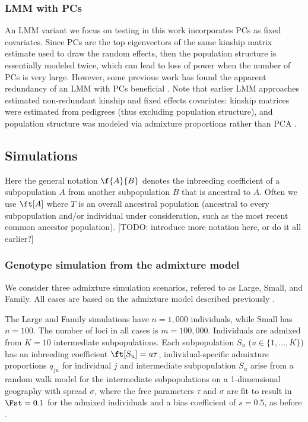 \documentclass[11pt]{article}
\begin{document}
\subsubsection{LMM with PCs}

An LMM variant we focus on testing in this work incorporates PCs as fixed covariates.
Since PCs are the top eigenvectors of the same kinship matrix estimate used to draw the random effects, then the population structure is essentially modeled twice, which can lead to loss of power when the number of PCs is very large.
However, some previous work has found the apparent redundancy of an LMM with PCs beneficial \citep{price_new_2010}.
Note that earlier LMM approaches estimated non-redundant kinship and fixed effects covariates: kinship matrices were estimated from pedigrees (thus excluding population structure), and population structure was modeled via admixture proportions rather than PCA \citep{yu_unified_2006, zhao_arabidopsis_2007}.


\subsection{Simulations}

Here the general notation $\f{A}{B}$ denotes the inbreeding coefficient of a subpopulation $A$ from another subpopulation $B$ that is ancestral to $A$.
Often we use $\ft[A]$ where $T$ is an overall ancestral population (ancestral to every subpopulation and/or individual under consideration, such as the most recent common ancestor population).
[TODO: introduce more notation here, or do it all earlier?]

\subsubsection{Genotype simulation from the admixture model}

We consider three admixture simulation scenarios, refered to as Large, Small, and Family.
All cases are based on the admixture model described previously \citep{ochoa_fst1, ochoa_estimating_2021}.

The Large and Family simulations have $n = 1,000$ individuals, while Small has $n = 100$.
The number of loci in all cases is $m = 100,000$.
Individuals are admixed from $K = 10$ intermediate subpopulations.
Each subpopulation $S_u$ ($u \in \{ 1, ..., K \}$) has an inbreeding coefficient $\ft[S_u] = u \tau$, individual-specific admixture proportions $q_{ju}$ for individual $j$ and intermediate subpopulation $S_u$ arise from a random walk model for the intermediate subpopulations on a 1-dimensional geography with spread $\sigma$, where the free parameters $\tau$ and $\sigma$ are fit to result in $\Fst = 0.1$ for the admixed individuals and a bias coefficient of $s = 0.5$, as before \citep{ochoa_estimating_2021}.
\end{document}
